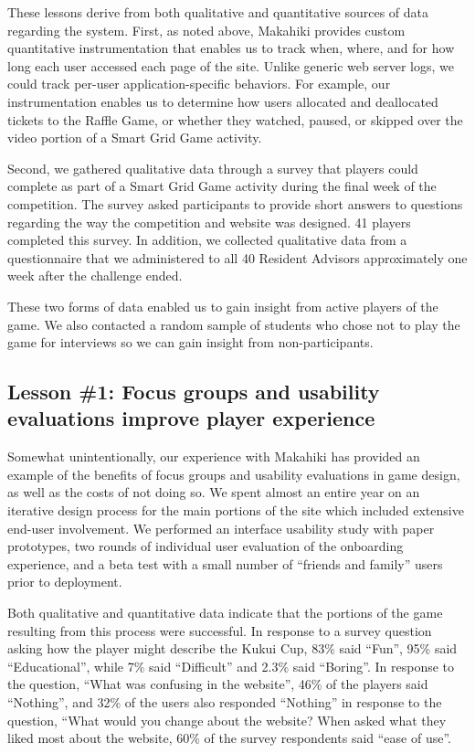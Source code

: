 \documentclass{acm_proc_article-sp}
\begin{document}
These lessons derive from both qualitative and quantitative sources of data
regarding the system.  First, as noted above, Makahiki provides custom
quantitative instrumentation that enables us to track when, where, and for how
long each user accessed each page of the site.  Unlike generic web server logs,
we could track per-user application-specific behaviors. For example, our
instrumentation enables us to determine how users allocated and deallocated
tickets to the Raffle Game, or whether they watched, paused, or skipped over
the video portion of a Smart Grid Game activity.

Second, we gathered qualitative data through a survey that players could complete as part of a Smart Grid Game activity during the final week of the competition. The survey asked participants to provide short answers to questions regarding the way the competition and website was designed.  41 players completed this survey.  In addition, we collected qualitative data from a questionnaire that we administered to all 40 Resident Advisors approximately one week after the challenge ended. 

These two forms of data enabled us to gain insight from active players of
the game. We also contacted a random sample of students who chose not to play the game for interviews so we can gain insight from non-participants.

\subsection{Lesson \#1: Focus groups and usability evaluations improve player
  experience}

Somewhat unintentionally, our experience with Makahiki has provided an
example of the benefits of focus groups and usability evaluations in game
design, as well as the costs of not doing so.  We spent almost an entire
year on an iterative design process for the main portions of the site which
included extensive end-user involvement.  We performed an interface
usability study with paper prototypes, two rounds of individual user
evaluation of the onboarding experience, and a beta test with a small
number of ``friends and family'' users prior to deployment.

Both qualitative and quantitative data indicate that the portions of the
game resulting from this process were successful.  In response to a survey
question asking how the player might describe the Kukui Cup, 83\% said
``Fun'', 95\% said ``Educational'', while 7\% said ``Difficult'' and 2.3\%
said ``Boring''.  In response to the question, ``What was confusing in the
website'', 46\% of the players said ``Nothing'', and 32\% of the users also
responded ``Nothing'' in response to the question, ``What would you change
about the website? When asked what they liked most about the website, 60\%
of the survey respondents said ``ease of use''.
\end{document}
